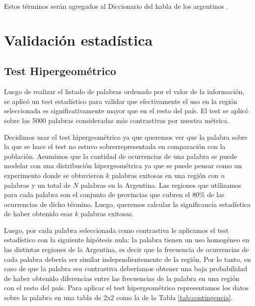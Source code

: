 Estos términos serán agregados al Diccionario del habla de los argentinos \cite{academia2008diccionario}.


\section{Validación estadística}
\subsection{Test Hipergeométrico}
Luego de realizar el listado de palabras ordenado por el valor de la información, se aplicó un test estadístico para validar que efectivamente el uso en la región seleccionada es significativamente mayor que en el resto del país. El test se aplicó sobre las 5000 palabras consideradas más contrastivas por nuestra métrica. 


Decidimos usar el test hipergeométrico ya que queremos ver que la palabra sobre la que se hace el test no estuvo sobrerrepresentada en comparación con la población. Asumimos que la cantidad de ocurrencias de una palabra se puede modelar con una distribución hipergeométrica ya que se puede pensar como un experimento donde se obtuvieron $k$ palabras exitosas en una región con $n$ palabras y un total de $N$ palabras en la Argentina. Las regiones que utilizamos para cada palabra son el conjunto de provincias que cubren el 80\% de las ocurrencias de dicho término. Luego, queremos calcular la significancia estadística de haber obtenido esas $k$ palabras exitosas.

Luego, por cada palabra seleccionada como contrastiva le aplicamos el test estadístico con la siguiente hipótesis nula: la palabra tienen un uso homogéneo en las distintas regiones de la Argentina, es decir que la frecuencia de ocurrencias de cada palabra debería ser similar independientemente de la región.
Por lo tanto, en caso de que la palabra sea contrastiva deberíamos obtener una baja probabilidad de haber obtenido diferencias entre las frecuencias de la palabra en una región con el resto del país. 
Para aplicar el test hipergeométrico representamos los datos sobre la palabra en una tabla de 2x2 como la de la Tabla \ref{tab:contingencia}.



